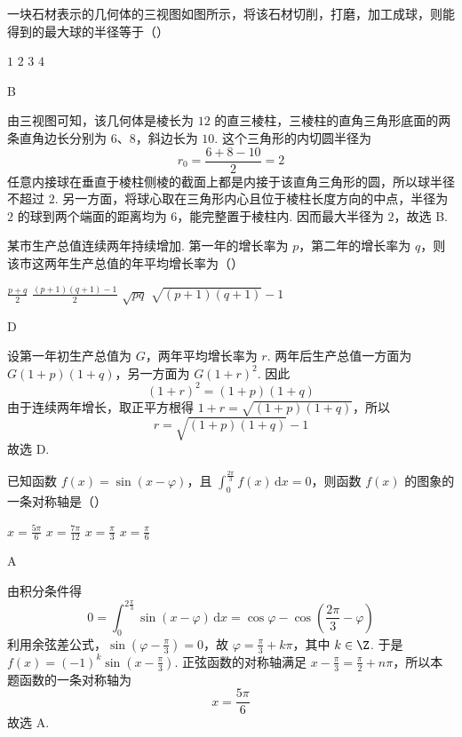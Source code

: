 \begin{problem}
一块石材表示的几何体的三视图如图所示，将该石材切削，打磨，加工成球，则能得到的最大球的半径等于（\quad）


\choices
    {\(1\)}
    {\(2\)}
    {\(3\)}
    {\(4\)}
\begin{answer}
B
\end{answer}

\begin{solution}
由三视图可知，该几何体是棱长为 \(12\) 的直三棱柱，三棱柱的直角三角形底面的两条直角边长分别为 \(6\)、\(8\)，斜边长为 \(10\). 这个三角形的内切圆半径为
\[
r_0=\frac{6+8-10}{2}=2
\]
任意内接球在垂直于棱柱侧棱的截面上都是内接于该直角三角形的圆，所以球半径不超过 \(2\). 另一方面，将球心取在三角形内心且位于棱柱长度方向的中点，半径为 \(2\) 的球到两个端面的距离均为 \(6\)，能完整置于棱柱内. 因而最大半径为 \(2\)，故选 B.
\end{solution}
\end{problem}

\begin{problem}
某市生产总值连续两年持续增加. 第一年的增长率为 \( p \)，第二年的增长率为 \( q \)，则该市这两年生产总值的年平均增长率为（\quad）

\choices
    {\(\frac{p + q}{2}\)}
    {\(\frac{\left(p + 1\right)\left(q + 1\right) - 1}{2}\)}
    {\(\sqrt{pq}\)}
    {\(\sqrt{\left(p + 1\right)\left(q + 1\right)} - 1\)}
\begin{answer}
D
\end{answer}

\begin{solution}
设第一年初生产总值为 \(G\)，两年平均增长率为 \(r\). 两年后生产总值一方面为 \(G(1+p)(1+q)\)，另一方面为 \(G(1+r)^2\). 因此
\[
(1+r)^2=(1+p)(1+q)
\]
由于连续两年增长，取正平方根得 \(1+r=\sqrt{(1+p)(1+q)}\)，所以
\[
r=\sqrt{(1+p)(1+q)}-1
\]
故选 D.
\end{solution}
\end{problem}

\begin{problem}
已知函数 \( f(x) = \sin\left(x - \varphi\right) \)，且 \( \int_{0}^{\frac{2\pi}{3}} f(x) \, \mathrm{d}x = 0 \)，则函数 \( f(x) \) 的图象的一条对称轴是（\quad）

\choices
    {\(x = \frac{5\pi}{6}\)}
    {\(x = \frac{7\pi}{12}\)}
    {\(x = \frac{\pi}{3}\)}
    {\(x = \frac{\pi}{6}\)}
\begin{answer}
A
\end{answer}

\begin{solution}
由积分条件得
\[
0=\int_0^{2\frac{\pi}{3}}\sin(x-\varphi)\,\mathrm{d}x
=\cos\varphi-\cos\left(\frac{2\pi}{3}-\varphi\right)
\]
利用余弦差公式，\(\sin(\varphi-\frac{\pi}{3})=0\)，故 \(\varphi=\frac{\pi}{3}+k\pi\)，其中 \(k\in\Z\). 于是 \(f(x)=(-1)^k\sin(x-\frac{\pi}{3})\). 正弦函数的对称轴满足 \(x-\frac{\pi}{3}=\frac{\pi}{2}+n\pi\)，所以本题函数的一条对称轴为
\[
x=\frac{5\pi}{6}
\]
故选 A.
\end{solution}
\end{problem}

